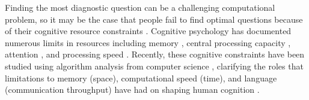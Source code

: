 \documentclass[10pt,letterpaper]{article}
\begin{document}
Finding the most diagnostic question can be a challenging computational problem, so it may be the case that people fail to find optimal questions because of their cognitive resource constraints \cite{coenen2019asking}.  
Cognitive psychology has documented numerous  limits  in resources including memory \cite{baddeley1997human}, central processing capacity \cite{pashler1984processing},  attention \cite{cavanagh2005tracking}, and processing speed \cite{ratcliff1998modeling}. 
Recently, these cognitive constraints have been studied using algorithm analysis from computer science \cite{LiederResourcerationalanalysisUnderstanding2020, gershman2015computational,dasgupta2021memory}, clarifying the roles that limitations to memory (space), computational speed (time), and language (communication throughput) have had on shaping human cognition \cite{GriffithsRationalUseCognitive2015a, griffiths2020understanding}.
\end{document}
